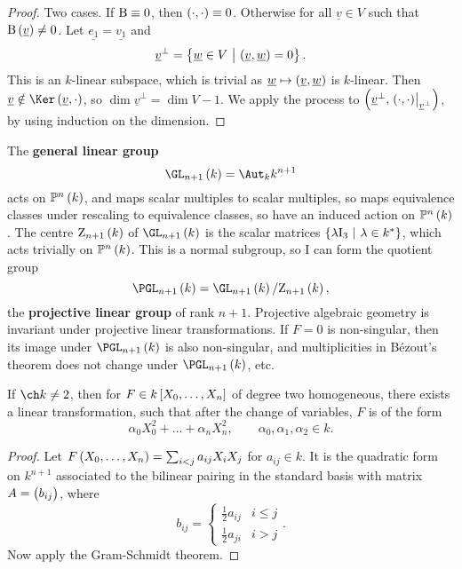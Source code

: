 \begin{proof}
Two cases. If $ \mathrm{B} \equiv 0 $, then $ \br{\cdot, \cdot} \equiv 0 $. Otherwise for all $ \underline{v} \in V $ such that $ \B\br{\underline{v}} \ne 0 $. Let $ \underline{e_1} = \underline{v_1} $ and
$$ \underline{v}^\perp = \cbr{\underline{w} \in V \st \br{\underline{v}, \underline{w}} = 0}. $$
This is an $ k $-linear subspace, which is trivial as $ \underline{w} \mapsto \br{\underline{v}, \underline{w}} $ is $ k $-linear. Then $ \underline{v} \notin \Ker \br{\underline{v}, \cdot} $, so $ \dim \underline{v}^\perp = \dim V - 1 $. We apply the process to $ \br{\underline{v}^\perp, \eval{\br{\cdot, \cdot}}_{\underline{v}^\perp}} $, by using induction on the dimension.
\end{proof}

\pagebreak

\begin{remark}
The \textbf{general linear group}
$$ \GL_{n + 1}\br{k} = \Aut_k k^{n + 1} $$
acts on $ \PP^n\br{k} $, and maps scalar multiples to scalar multiples, so maps equivalence classes under rescaling to equivalence classes, so have an induced action on $ \PP^n\br{k} $. The centre $ \Z_{n + 1}\br{k} $ of $ \GL_{n + 1}\br{k} $ is the scalar matrices $ \cbr{\lambda \I_3 \st \lambda \in k^*} $, which acts trivially on $ \PP^n\br{k} $. This is a normal subgroup, so I can form the quotient group
$$ \PGL_{n + 1}\br{k} = \GL_{n + 1}\br{k} / \Z_{n + 1}\br{k}, $$
the \textbf{projective linear group} of rank $ n + 1 $. Projective algebraic geometry is invariant under projective linear transformations. If $ F = 0 $ is non-singular, then its image under $ \PGL_{n + 1}\br{k} $ is also non-singular, and multiplicities in B\'ezout's theorem does not change under $ \PGL_{n + 1}\br{k} $, etc.
\end{remark}

\begin{theorem}
If $ \ch k \ne 2 $, then for $ F \in k\sbr{X_0, \dots, X_n} $ of degree two homogeneous, there exists a linear transformation, such that after the change of variables, $ F $ is of the form
$$ \alpha_0X_0^2 + \dots + \alpha_nX_n^2, \qquad \alpha_0, \alpha_1, \alpha_2 \in k. $$
\end{theorem}

\begin{proof}
Let $ F\br{X_0, \dots, X_n} = \sum_{i < j} a_{ij}X_iX_j $ for $ a_{ij} \in k $. It is the quadratic form on $ k^{n + 1} $ associated to the bilinear pairing in the standard basis with matrix $ A = \br{b_{ij}} $, where
$$ b_{ij} =
\begin{cases}
\tfrac{1}{2}a_{ij} & i \le j \\
\tfrac{1}{2}a_{ji} & i > j
\end{cases}.
$$
Now apply the Gram-Schmidt theorem.
\end{proof}

